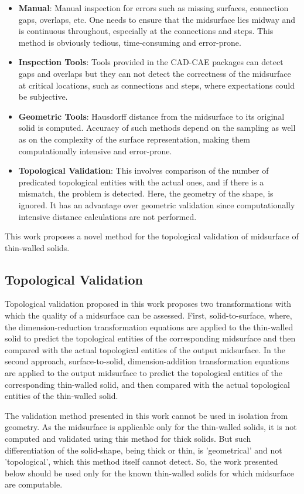 \begin{itemize}
[noitemsep,topsep=2pt,parsep=2pt,partopsep=2pt]
\item \textbf{Manual}: Manual inspection for errors such as missing surfaces, connection gaps, overlaps, etc. One needs to ensure that the midsurface lies midway and is continuous throughout, especially at the connections and steps. This method is obviously tedious, time-consuming and error-prone.
\item \textbf{Inspection Tools}: Tools provided in the CAD-CAE packages can detect gaps and overlaps but they can not detect the correctness of the midsurface at critical locations, such as connections and steps, where expectations could be  subjective.
\item \textbf{Geometric Tools}: Hausdorff distance from the midsurface to its original solid is computed. Accuracy of such methods depend on the sampling as well as on the complexity of the surface representation, making them computationally intensive and error-prone. 
\item \textbf{Topological Validation}: This involves comparison of the number of predicated topological entities with the actual ones, and if there is a mismatch, the  problem is detected. Here, the geometry of the shape, is ignored. It has an advantage over geometric validation since computationally intensive distance calculations are not performed. 
\end{itemize}

This work proposes a novel method for the topological validation of midsurface of thin-walled solids.

\subsection{Topological Validation}  
Topological validation proposed in this work proposes two transformations with which the quality of a midsurface can be assessed. First, solid-to-surface, where, the dimension-reduction transformation equations are applied to the thin-walled solid to predict the topological entities of the corresponding midsurface and then compared with the actual topological entities of the output midsurface. In the second approach, surface-to-solid, dimension-addition transformation equations are applied to the output midsurface to predict the topological entities of the corresponding thin-walled solid, and then compared with the actual topological entities of the thin-walled solid.

The validation method presented in this work cannot be used in isolation from geometry. As the midsurface is applicable only for the thin-walled solids, it is not computed and validated using this method for thick solids. But such differentiation of the solid-shape, being thick or thin, is 'geometrical' and not 'topological', which this method itself cannot detect. So, the work presented below should be used only for the known thin-walled solids for which midsurface are computable.

